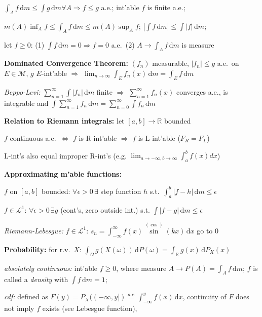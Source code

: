 \documentclass[8pt,twoside]{extarticle}
\begin{document}
\begin{multicols}{2}
$\int_A f \, \mathrm{d}m \leq \int g \, \mathrm{d}m \forall A \Rightarrow f\leq g$ a.e.; int'able $f$ is finite a.e.; 

$m(A)\inf_A f \leq \int_A f \, \mathrm{d}m \leq m(A) \sup_A f$; $|\int f \, \mathrm{d}m| \leq \int |f| \, \mathrm{d}m$;

let $f\geq 0$: (1) $\int f \, \mathrm{d}m{=}0 \Rightarrow f{=}0$ a.e.\ (2) $A\to \int_A f \, \mathrm{d}m$ is  measure

\textbf{Dominated Convergence Theorem:} $(f_n)$ measurable, $|f_n|{\leq} g$ a.e.\ on $E{\in} \mathcal{M}$, $g$ $E$-int'able $\Rightarrow$  $\displaystyle\lim_{n\to\infty} \int_E f_n(x)\,\mathrm{d}m = \int_E f \,\mathrm{d}m$

\textit{Beppo-Levi:} $\sum_{n=1}^\infty \int |f_n| \,\mathrm{d}m$ finite $\Rightarrow$ $\sum_{n=1}^\infty f_n(x)$ converges a.e., is integrable and
$\int\sum_{n=1}^\infty f_n \,\mathrm{d}m = \sum_{n=0}^\infty \int f_n \,\mathrm{d}m$

\textbf{Relation to Riemann integrals:} let $[a,b] \to \mathbb{R}$ bounded

$f$ continuous a.e.\ $\Leftrightarrow$  $f$ is R-int'able $\Rightarrow$ $f$ is L-int'able ($F_R=F_L$)

L-int's also equal improper R-int's (e.g. $\displaystyle\lim_{a\to -\infty, b\to \infty} \int_a^b f(x)dx$)

\textbf{Approximating m'able functions:}

 $f$ on $[a,b]$ bounded: $\forall \epsilon>0\, \exists$ step function $h$ s.t.\ $\int_a^b|f{-}h|\,\mathrm{d}m\leq \epsilon$
 
 $f{\in} \mathcal{L}^1$: $\forall \epsilon{>}0 \, \exists g$ (cont's, zero outside int.) s.t. $\int|f{-}g|\,\mathrm{d}m\leq \epsilon$
 
 \textit{Riemann-Lebesgue:} $f{\in}\mathcal{L}^1$: $s_n {=} \int_{{-}\infty}^\infty f(x)\overset{(\cos)}{\sin} (kx)  \,\mathrm{d}x$ go to 0

\textbf{Probability:} for r.v.\ $X$: $\int_\Omega g(X(\omega))\,\mathrm{d}P(\omega) = \int_\mathbb{R} g(x)\,\mathrm{d}P_X(x)$

\textit{absolutely continuous:} int'able $f\geq 0$, where measure $A\to P(A)=\int_A f \,\mathrm{d}m$; $f$ is called a \textit{density} with $\int f \,\mathrm{d} m = 1$; 

\textit{cdf:} defined as $F(y)= P_X((-\infty, y])\overset{a.c.}{=}\int_{-\infty}^y f(x) \,\mathrm{d}x$,
 continuity of $F$ does not imply $f$ exists (see Lebesgue function), 


\end{multicols}
\end{document}
